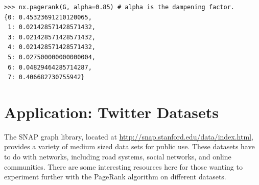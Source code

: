 \begin{lstlisting}
>>> nx.pagerank(G, alpha=0.85) # alpha is the dampening factor.
{0: 0.45323691210120065,
 1: 0.021428571428571432,
 3: 0.021428571428571432,
 4: 0.021428571428571432,
 5: 0.027500000000000004,
 6: 0.04829464285714287,
 7: 0.406682730755942}
\end{lstlisting}

\section*{Application: Twitter Datasets}
The SNAP graph library, located at \url{http://snap.stanford.edu/data/index.html}, provides a variety of medium sized data sets for public use.
These datasets have to do with networks, including road systems, social networks, and online communities. There are some interesting resources here for those wanting to experiment further with the PageRank algorithm on different datasets.


